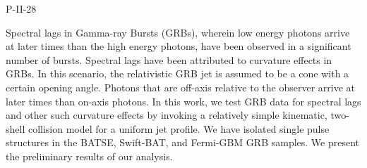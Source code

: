 P-II-28


\bigskip



\bigskip

\noindent Spectral lags in Gamma-ray Bursts (GRBs), wherein low energy photons
arrive at later times than the high energy photons, have been observed
in a significant number of bursts. Spectral lags have been attributed
to curvature effects in GRBs. In this scenario, the relativistic GRB
jet is assumed to be a cone with a certain opening angle. Photons that
are off-axis relative to the observer arrive at later times than
on-axis photons. In this work, we test GRB data for spectral lags and
other such curvature effects by invoking a relatively simple
kinematic, two-shell collision model for a uniform jet profile. We
have isolated single pulse structures in the BATSE, Swift-BAT, and
Fermi-GBM GRB samples.  We present the preliminary results of our
analysis.
